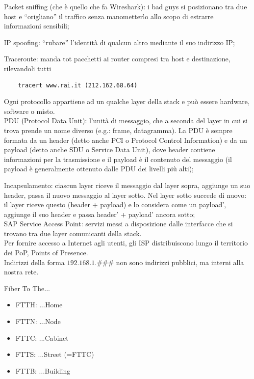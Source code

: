 \noindent {}Packet sniffing (che è quello che fa Wireshark): i bad guys si posizionano tra due host e ``origliano'' il traffico senza manometterlo allo scopo di estrarre informazioni sensibili;

\noindent {}IP spoofing: ``rubare'' l'identità di qualcun altro mediante il suo indirizzo IP;

\noindent {}Traceroute: manda tot pacchetti ai router compresi tra host e destinazione, rilevandoli tutti
\begin{verbatim}
    tracert www.rai.it (212.162.68.64)
\end{verbatim}

\noindent Ogni protocollo appartiene ad un qualche layer della stack e può essere hardware, software o misto.\\

\noindent {}PDU (Protocol Data Unit): l'unità di messaggio, che a seconda del layer in cui si trova prende un nome diverso (e.g.: frame, datagramma). La PDU è sempre formata da un header (detto anche PCI o Protocol Control Information) e da un payload (detto anche SDU o Service Data Unit), dove header contiene informazioni per la trasmissione e il payload è il contenuto del messaggio (il payload è generalmente ottenuto dalle PDU dei livelli più alti);

\noindent {}Incapsulamento: ciascun layer riceve il messaggio dal layer sopra, aggiunge un suo header, passa il nuovo messaggio al layer sotto. Nel layer sotto succede di nuovo: il layer riceve questo (header + payload) e lo considera come un payload', aggiunge il suo header e passa header' + payload' ancora sotto;\\

\noindent {}SAP Service Access Point: servizi messi a disposizione dalle interfacce che si trovano tra due layer comunicanti della stack.\\

\noindent Per fornire accesso a Internet agli utenti, gli ISP distribuiscono lungo il territorio dei PoP, Points of Presence.\\

\noindent Indirizzi della forma $192.168.1.\#\#\#$ non sono indirizzi pubblici, ma interni alla nostra rete.\\

\noindent

\noindent Fiber To The...

\begin{itemize}
    \item FTTH: ...Home
    \item FTTN: ...Node
    \item FTTC: ...Cabinet
    \item FTTS: ...Street (=FTTC)
    \item FTTB: ...Building
\end{itemize}

